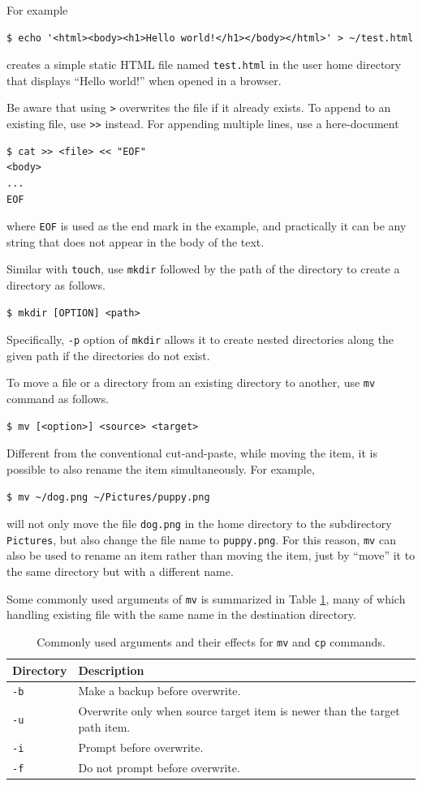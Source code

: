 For example
\begin{lstlisting}
$ echo '<html><body><h1>Hello world!</h1></body></html>' > ~/test.html
\end{lstlisting}
creates a simple static HTML file named \texttt{test.html} in the user home directory that displays ``Hello world!'' when opened in a browser. 

Be aware that using \verb|>| overwrites the file if it already exists. To append to an existing file, use \verb|>>| instead. For appending multiple lines, use a here-document
\begin{lstlisting}
$ cat >> <file> << "EOF"
<body>
...
EOF
\end{lstlisting}
where \verb|EOF| is used as the end mark in the example, and practically it can be any string that does not appear in the body of the text.

Similar with \verb|touch|, use \verb|mkdir| followed by the path of the directory to create a directory as follows.
\begin{lstlisting}
$ mkdir [OPTION] <path>
\end{lstlisting}
Specifically, \verb|-p| option of \verb|mkdir| allows it to create nested directories along the given path if the directories do not exist.

To move a file or a directory from an existing directory to another, use \verb|mv| command as follows.
\begin{lstlisting}
$ mv [<option>] <source> <target>
\end{lstlisting}
Different from the conventional cut-and-paste, while moving the item, it is possible to also rename the item simultaneously. For example,
\begin{lstlisting}
$ mv ~/dog.png ~/Pictures/puppy.png
\end{lstlisting}
will not only move the file \verb|dog.png| in the home directory to the subdirectory \verb|Pictures|, but also change the file name to \verb|puppy.png|. For this reason, \verb|mv| can also be used to rename an item rather than moving the item, just by ``move'' it to the same directory but with a different name.

Some commonly used arguments of \verb|mv| is summarized in Table \ref{ch:fm:tab:mvcpcommandargument}, many of which handling existing file with the same name in the destination directory.

\begin{table}[!htb]
  \centering \caption{Commonly used arguments and their effects for \texttt{mv} and \texttt{cp} commands.}\label{ch:fm:tab:mvcpcommandargument}
  \begin{tabularx}{\textwidth}{lX}
    \hline
    Directory & Description \\ \hline
    \verb|-b| & Make a backup before overwrite. \\ 
    \verb|-u| & Overwrite only when source target item is newer than the target path item. \\ 
    \verb|-i| & Prompt before overwrite. \\ 
    \verb|-f| & Do not prompt before overwrite. \\
    \hline
  \end{tabularx}
\end{table}

